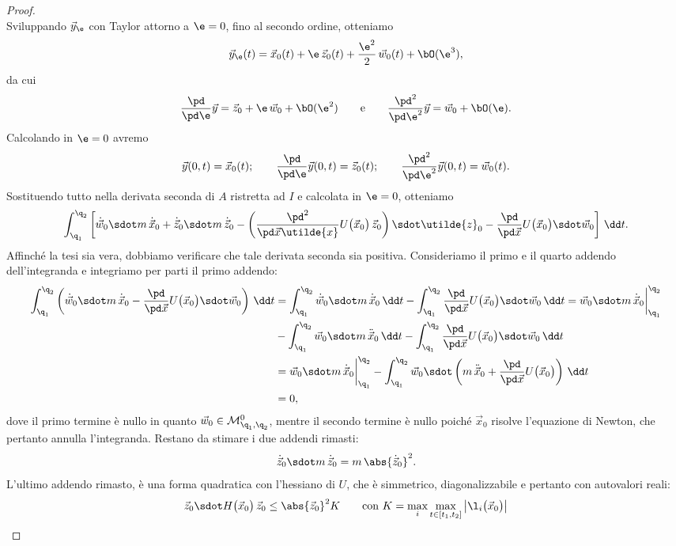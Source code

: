 \begin{proof}
\[	\]
	Sviluppando \(\vec{y}_\e\) con Taylor attorno a \(\e=0\), fino al secondo ordine, otteniamo
	\[
		\vec{y}_\e(t) = \vec{x}_0(t)+\e\,\vec{z}_0(t)+\frac{\e^2}{2}\,\vec{w}_0(t)+\bO(\e^3),
	\]
	da cui
	\[
		\frac{\pd}{\pd\e}\vec{y} = \vec{z}_0+\e\,\vec{w}_0+\bO(\e^2) \qquad\text{e}\qquad \frac{\pd^2}{\pd\e^2}\vec{y} = \vec{w}_0+\bO(\e).
	\]
	Calcolando in \(\e=0\) avremo
	\[
		\vec{y}(0,t) = \vec{x}_0(t); \qquad \frac{\pd}{\pd\e}\vec{y}(0,t) = \vec{z}_0(t); \qquad \frac{\pd^2}{\pd\e^2}\vec{y}(0,t) = \vec{w}_0(t).
	\]
	Sostituendo tutto nella derivata seconda di \(A\) ristretta ad \(I\) e calcolata in \(\e=0\), otteniamo
	\[
		\int_{\q_1}^{\q_2} \left[\dot{\vec{w}}_0 \sdot m\,\dot{\vec{x}}_0+\dot{\vec{z}}_0 \sdot m\,\dot{\vec{z}}_0 - \left(\frac{\pd^2}{\pd\vec{x}\utilde{x}}U\big(\vec{x}_0\big) \, \vec{z}_0\right) \sdot \utilde{z}_0 - \frac{\pd}{\pd\vec{x}}U\big(\vec{x}_0\big) \sdot \vec{w}_0\right]\,\dd t.
	\]
	Affinché la tesi sia vera, dobbiamo verificare che tale derivata seconda sia positiva.
	Consideriamo il primo e il quarto addendo dell'integranda e integriamo per parti il primo addendo:
	\[
		\begin{split}
			\int_{\q_1}^{\q_2} \left(\dot{\vec{w}}_0 \sdot m\,\dot{\vec{x}}_0 - \frac{\pd}{\pd\vec{x}}U\big(\vec{x}_0\big)\sdot\vec{w}_0\right)\,\dd t & = \int_{\q_1}^{\q_2} \dot{\vec{w}}_0 \sdot m\,\dot{\vec{x}}_0\,\dd t - \int_{\q_1}^{\q_2} \frac{\pd}{\pd\vec{x}}U\big(\vec{x}_0\big)\sdot\vec{w}_0\,\dd t = \vec{w}_0\sdot m\,\dot{\vec{x}}_0 \bigg|_{\q_1}^{\q_2}\\
			& - \int_{\q_1}^{\q_2} \vec{w}_0 \sdot m\,\ddot{\vec{x}}_0\,\dd t - \int_{\q_1}^{\q_2} \frac{\pd}{\pd\vec{x}}U\big(\vec{x}_0\big)\sdot\vec{w}_0\,\dd t\\
			& = \vec{w}_0\sdot m\,\dot{\vec{x}}_0 \bigg|_{\q_1}^{\q_2} - \int_{\q_1}^{\q_2} \vec{w}_0 \sdot \left(m\,\ddot{\vec{x}}_0 + \frac{\pd}{\pd \vec{x}}U\big(\vec{x}_0\big)\right)\,\dd t\\
			& = 0,
		\end{split}
	\]
	dove il primo termine è nullo in quanto \(\vec{w}_0 \in \mathcal{M}_{\q_1,\q_2}^0\), mentre il secondo termine è nullo poiché \(\vec{x}_0\) risolve l'equazione di Newton, che pertanto annulla l'integranda.
	Restano da stimare i due addendi rimasti:
	\[
		\dot{\vec{z}}_0 \sdot m\,\dot{\vec{z}}_0 = m\,\abs{\dot{\vec{z}}_0}^2.
	\]
	L'ultimo addendo rimasto, è una forma quadratica con l'hessiano di \(U\), che è simmetrico, diagonalizzabile e pertanto con autovalori reali:
	\[
		\vec{z}_0 \sdot H\big(\vec{x}_0\big)\,\vec{z}_0 \le \abs{\vec{z}_0}^2 K \qquad\text{con }K = \max_i \max_{t\in[t_1,t_2]} \big\lvert \l_i\big(\vec{x}_0\big)\big\rvert
\]
\end{proof}
